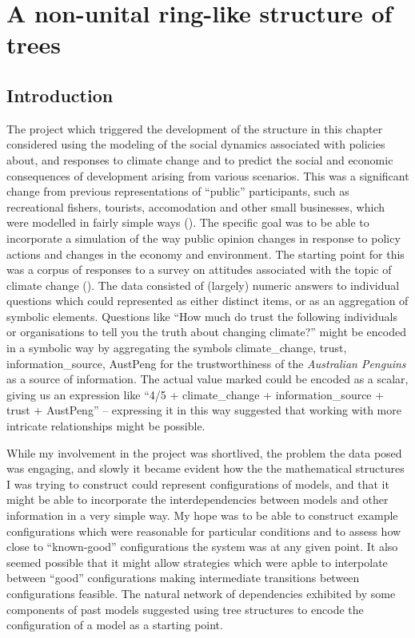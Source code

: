 
\chapter[A RING-LIKE STRUCTURE OF TREES]{A non-unital ring-like structure of trees}\label{treering}
\section{Introduction}
The project which triggered the development of the structure in this
chapter considered using the modeling of the social dynamics
associated with policies about, and responses to climate change and to
predict the social and economic consequences of development arising
from various scenarios. This was a significant change from previous
representations of ``public'' participants, such as recreational
fishers, tourists, accomodation and other small businesses, which were
modelled in fairly simple ways (\cite{fulton2011ningaloo,gray2014}).
The specific goal was to be able to incorporate a simulation of the
way public opinion changes in response to policy actions and changes
in the economy and environment.  The starting point for this was a
corpus of responses to a survey on attitudes associated with the topic
of climate change (\cite{boschetti2012}). The data consisted of
(largely) numeric answers to individual questions which could
represented as either distinct items, or as an aggregation of symbolic
elements.  Questions like ``How much do trust the following
individuals or organisations to tell you the truth about changing
climate?'' might be encoded in a symbolic way by aggregating the
symbols \textsf{climate\_change, trust, information\_source, AustPeng}
for the trustworthiness of the \emph{Australian Penguins} as a source
of information. The actual value marked could be encoded as a scalar,
giving us an expression like ``\textsf{4/5 + climate\_change +
  information\_source + trust + AustPeng}'' -- expressing it in this
way suggested that working with more intricate relationships might be
possible.

While my involvement in the project was shortlived, the problem the
data posed was engaging, and slowly it became evident how the the
mathematical structures I was trying to construct could represent
configurations of models, and that it might be able to incorporate the
interdependencies between models and other information in a very
simple way.  My hope was to be able to construct example
configurations which were reasonable for particular conditions and to
assess how close to ``known-good'' configurations the system was at
any given point.  It also seemed possible that it might allow
strategies which were apble to interpolate between ``good''
configurations making intermediate transitions between configurations
feasible. The natural network of dependencies exhibited by some
components of past models suggested using tree structures to encode
the configuration of a model as a starting point.


